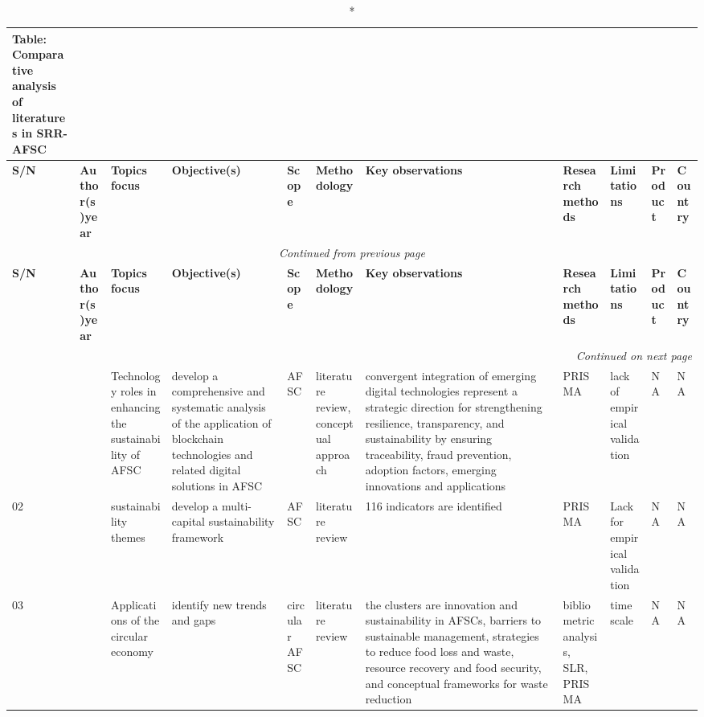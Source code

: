 \documentclass[a4paper,10pt]{article}
\begin{document}
\clearpage
\onecolumn
\begin{landscape}
\begin{small}
\begingroup
\small
\setlength{\tabcolsep}{2pt}
\renewcommand{\arraystretch}{0.9}
\begin{longtable}{p{0.5cm} p{2cm} p{2.5cm} p{4cm} p{1cm} p{2.5cm} p{5.5cm} p{2.5cm} p{2.5cm} p{1.8cm} p{1.5cm}}
\caption*{Table: Comparative analysis of literatures in SRR-AFSC} \\
\toprule
\textbf{S/N} & \textbf{Author(s)year} & \textbf{Topics focus} & \textbf{Objective(s)}& \textbf{Scope} & \textbf{Methodology} & \textbf{Key observations} & \textbf{Research methods} & \textbf{Limitations} & \textbf{Product} & \textbf{Country} \\
\midrule
\endfirsthead
\multicolumn{11}{c}{\textit{Continued from previous page}} \\
\toprule
\textbf{S/N} & \textbf{Author(s)year} & \textbf{Topics focus} & \textbf{Objective(s)}& \textbf{Scope}& \textbf{Methodology} & \textbf{Key observations} & \textbf{Research methods} & \textbf{Limitations} & \textbf{Product} & \textbf{Country} \\
\midrule
\endhead
\bottomrule
\multicolumn{11}{r}{\textit{Continued on next page}} \\
\endfoot
\bottomrule
\endlastfoot
01 & \textcite{Sorina4} &  Technology roles in enhancing the sustainability of AFSC & develop a comprehensive and systematic analysis of the application of blockchain technologies and related digital solutions in AFSC  & AFSC &  literature review, conceptual approach& convergent integration of emerging digital technologies represent a strategic direction for strengthening resilience, transparency, and sustainability by ensuring traceability, fraud prevention, adoption factors, emerging innovations and applications & PRISMA &lack of empirical validation  &NA& NA\\
02 & \textcite{Ayla6} &  sustainability themes  & develop a multi-capital sustainability framework &AFSC & literature review& 116 indicators are identified &PRISMA   & Lack for empirical validation& NA& NA  \\
03 & \textcite{Karel8} &  Applications of the circular economy & identify new trends and gaps&circular AFSC & literature review& the clusters are innovation and sustainability in AFSCs, barriers to sustainable management, strategies to reduce food loss and waste, resource recovery and food security, and conceptual frameworks for waste reduction &bibliometric analysis, SLR, PRISMA   & time scale & NA& NA  \\

\end{longtable}
\end{small}
\end{landscape}
\end{document}

